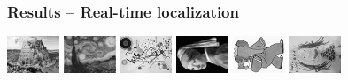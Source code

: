 \documentclass[lualatex,aspectratio=169,xcolor=dvipsnames,10pt,c]{beamer}
\begin{document}
\frame
{
	\frametitle{Results – Real-time localization}
	
	{\footnotesize
	\makebox[\textwidth][c]{\textcolor{gray}{Markov Localisation, 36 discretization angles, A2}}
	}

	\hfill
	\hfill
	\hfill
	\hfill
	\hfill

	\vspace{.6em}

	\includegraphics[width=.15\textwidth,interpolate=false]{maps/breugel_babel_A2} \hfill
	\includegraphics[width=.15\textwidth,interpolate=false]{maps/van-gogh_starry-night_A2} \hfill
	\includegraphics[width=.15\textwidth,interpolate=false]{maps/kandinsky_comp-8_A2} \hfill
	\includegraphics[width=.15\textwidth,interpolate=false]{maps/vermeer_girl-pearl_A2} \hfill
	\includegraphics[width=.15\textwidth,interpolate=false]{maps/babar_A2} \hfill
	\includegraphics[width=.15\textwidth,interpolate=false]{maps/child-drawing_tooth-fairy_A2}

	\vspace{.7em}

}
\end{document}
